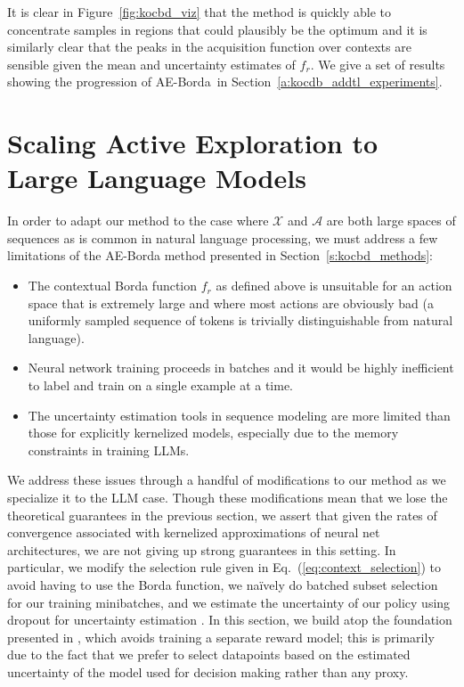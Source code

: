 \documentclass{article} \usepackage{iclr2023_conference,times}
\def\eqref#1{Eq.~(\ref{#1})}
\newcommand{\Contextspace}{\mathcal{X}}
\newcommand{\Actionspace}{\mathcal{A}}
\newcommand{\borda}{f_r}
\newcommand{\algnm}{AE-Borda}
\newcommand{\algnmsp}{{\algnm} }
\begin{document}
It is clear in Figure~\ref{fig:kocbd_viz} that the method is quickly able to concentrate samples in regions that could plausibly be the optimum and it is similarly clear that the peaks in the acquisition function over contexts are sensible given the mean and uncertainty estimates of $f_r$. We give a set of results showing the progression of \algnm\ in Section~\ref{a:kocdb_addtl_experiments}.

 \vspace{-2mm}
\section{Scaling Active Exploration to Large Language Models}
\label{s:llm}
\vspace{-2mm}
In order to adapt our method to the case where $\Contextspace$ and $\Actionspace$ are both large spaces of sequences as is common in natural language processing, we must address a few limitations of the \algnmsp method presented in Section~\ref{s:kocbd_methods}:
\begin{itemize}[leftmargin=6mm, topsep=0mm, parsep=1mm]
\item The contextual Borda function $\borda$ as defined above is unsuitable for an action space that is extremely large and where most actions are obviously bad (a uniformly sampled sequence of tokens is trivially distinguishable from natural language).
\item Neural network training proceeds in batches and it would be highly inefficient to label and train on a single example at a time.
\item The uncertainty estimation tools in sequence modeling are more limited than those for explicitly kernelized models, especially due to the memory constraints in training LLMs.
\end{itemize}
We address these issues through a handful of modifications to our method as we specialize it to the LLM case.
Though these modifications mean that we lose the theoretical guarantees in the previous section, we assert that given the rates of convergence associated with kernelized approximations of neural net architectures, we are not giving up strong guarantees in this setting.
In particular, we modify the selection rule given in \eqref{eq:context_selection} to avoid having to use the Borda function, we na\"ively do batched subset selection for our training minibatches, and we estimate the uncertainty of our policy using dropout for uncertainty estimation \citep{gal2016dropout}.
In this section, we build atop the foundation presented in \citet{dpo}, which avoids training a separate reward model; this is primarily due to the fact that we prefer to select datapoints based on the estimated uncertainty of the model used for decision making rather than any proxy.
\end{document}
